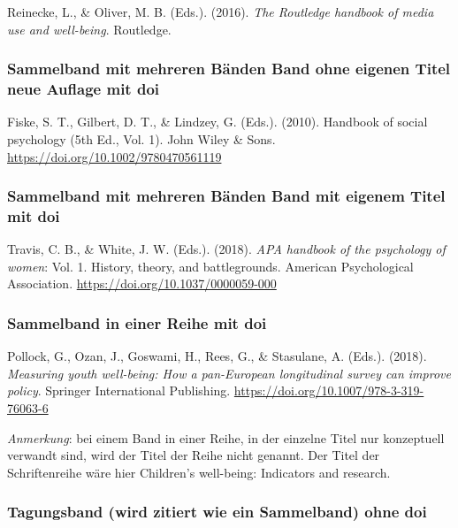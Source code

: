 \documentclass[
  letterpaper,
  DIV=11]{scrreprt}
\begin{document}
Reinecke, L., \& Oliver, M. B. (Eds.). (2016). \emph{The Routledge
handbook of media use and well-being}. Routledge.

\subsubsection{Sammelband mit mehreren Bänden \textbar{} Band ohne
eigenen Titel \textbar{} neue Auflage \textbar{} mit
doi}\label{sammelband-mit-mehreren-buxe4nden-band-ohne-eigenen-titel-neue-auflage-mit-doi}

Fiske, S. T., Gilbert, D. T., \& Lindzey, G. (Eds.). (2010). Handbook of
social psychology (5th Ed., Vol. 1). John Wiley \& Sons.
\url{https://doi.org/10.1002/9780470561119}

\subsubsection{Sammelband mit mehreren Bänden \textbar{} Band mit
eigenem Titel \textbar{} mit
doi}\label{sammelband-mit-mehreren-buxe4nden-band-mit-eigenem-titel-mit-doi}

Travis, C. B., \& White, J. W. (Eds.). (2018). \emph{APA handbook of the
psychology of women}: Vol. 1. History, theory, and battlegrounds.
American Psychological Association.
\url{https://doi.org/10.1037/0000059-000}

\subsubsection{Sammelband in einer Reihe \textbar{} mit
doi}\label{sammelband-in-einer-reihe-mit-doi}

Pollock, G., Ozan, J., Goswami, H., Rees, G., \& Stasulane, A. (Eds.).
(2018). \emph{Measuring youth well-being: How a pan-European
longitudinal survey can improve policy}. Springer International
Publishing. \url{https://doi.org/10.1007/978-3-319-76063-6}

\emph{Anmerkung}: bei einem Band in einer Reihe, in der einzelne Titel
nur konzeptuell verwandt sind, wird der Titel der Reihe nicht genannt.
Der Titel der Schriftenreihe wäre hier Children's well-being: Indicators
and research.

\subsubsection{Tagungsband (wird zitiert wie ein Sammelband) \textbar{}
ohne doi}\label{tagungsband-wird-zitiert-wie-ein-sammelband-ohne-doi}
\end{document}
